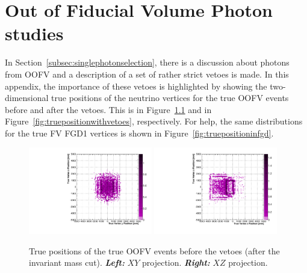 


\chapter{Out of Fiducial Volume Photon studies}
\label{app:oofvphoton}

In Section~\ref{subsec:singlephotonselection}, there is a discussion
about photons from \Gls{OOFV} and a description of a set of rather
strict vetoes is made. In this appendix, the importance of these vetoes
is highlighted by showing the two-dimensional true positions of the
neutrino vertices for the true \Gls{OOFV} events before and after the vetoes.
This is in Figure~\ref{fig:truepositionnovetoes} and in
Figure~\ref{fig:truepositionwithvetoes}, respectively. For help, the
same distributions for the true \Gls{FV} \Gls{FGD}1 vertices is shown
in Figure~\ref{fig:truepositioninfgd}.

\begin{figure}[ht]
  \center
  \includegraphics[width=0.48\textwidth]{images/AppOOFV/4_7.pdf}
  \includegraphics[width=0.48\textwidth]{images/AppOOFV/5_7.pdf}
  \caption[True positions of the OOFV events before the vetoes]{True
    positions of the true \Gls{OOFV} events before the vetoes (after
    the invariant mass cut).  \textbf{\textit{Left:}} $XY$
    projection. \textbf{\textit{Right:}} $XZ$ projection.}
  \label{fig:truepositionnovetoes}
\end{figure}

